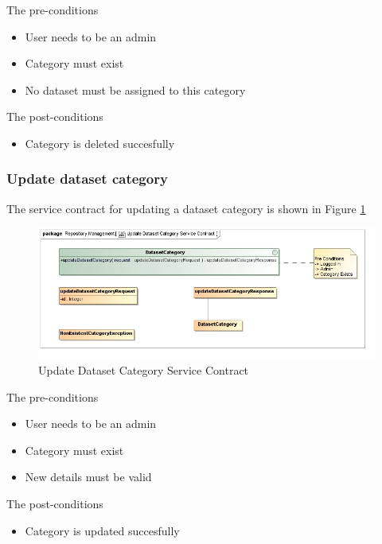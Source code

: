 The pre-conditions
\begin{itemize}
  \item User needs to be an admin
  \item Category must exist
  \item No dataset must be assigned to this category
\end{itemize}

The post-conditions
\begin{itemize}
  \item Category is deleted succesfully
\end{itemize}

\subsubsection {Update dataset category}

The service contract for updating a dataset category is shown in Figure \ref{fig:updateDatasetCatService}
\begin{figure}[H]
  \begin{center}
  \includegraphics[scale=0.6]{../Diagrams and Charts/Test Data/Update Dataset Category Service Contract.jpg}
  \caption{Update Dataset Category Service Contract}
  \label{fig:updateDatasetCatService}
  \end{center}
  
\end{figure}


The pre-conditions
\begin{itemize}
  \item User needs to be an admin
  \item Category must exist
  \item New details must be valid
\end{itemize}

The post-conditions
\begin{itemize}
  \item Category is updated succesfully
\end{itemize}
